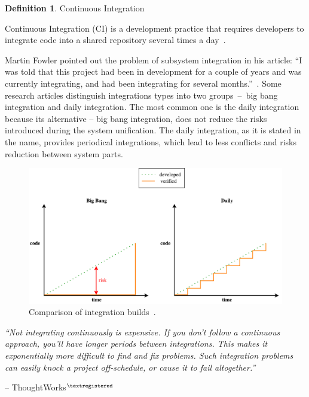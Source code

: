 \documentclass[12pt,a4paper]{article}
\newcommand{\uv}[1]{``#1''}
\theoremstyle{definition}
\newtheorem{definition}{Definition}[section]
\begin{document}
        \begin{definition}
            Continuous Integration\\[-5mm]
            \begin{center}
                \begin{minipage}{0.9\textwidth}
                    Continuous Integration (CI) is a development practice that requires developers to integrate code into a shared repository several times a day~\cite{thoughtworks}.\\[-2.5mm]
                \end{minipage}
            \end{center}
        \end{definition}

        Martin Fowler pointed out the problem of subsystem integration in his article: \uv{I was told that this project had been in development for a couple of years and was currently integrating, and had been integrating for several months.}~\cite{ci2}. Some research articles distinguish integrations types into two groups~--~big bang integration and daily integration. The most common one is the daily integration because its alternative -- big bang integration, does not reduce the risks introduced during the system unification. The daily integration, as it is stated in the name, provides periodical integrations, which lead to less conflicts and risks reduction between system parts.

        \begin{figure}[H]
            \centering
            \includegraphics[scale=0.5]{img/big_bang_vs_daily_build.pdf}
            \caption{Comparison of integration builds~\cite{FITMT21007}.}
            \label{fig:cd}
        \end{figure}

        \begin{displayquote}
            \textit{\uv{Not integrating continuously is expensive. If you don’t follow a continuous approach, you’ll have longer periods between integrations. This makes it exponentially more difficult to find and fix problems. Such integration problems can easily knock a project off-schedule, or cause it to fail altogether.}}\\[-2em]
            \begin{flushright}
                -- ThoughtWorks$^{\tiny{\textregistered}}$~\cite{thoughtworks}
            \end{flushright}
        \end{displayquote}
\end{document}
